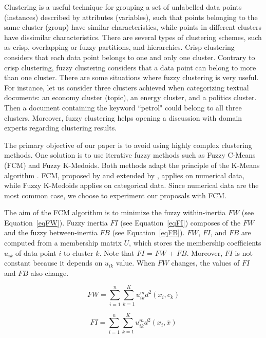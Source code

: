 \documentclass[runningheads,a4paper]{llncs}
\begin{document}
Clustering is a useful technique for grouping a set of unlabelled data points (instances) described by attributes (variables), such that points belonging to the same cluster (group) have similar characteristics, while points in different clusters have dissimilar characteristics. There are several types of clustering schemes, such as crisp, overlapping or fuzzy partitions, and hierarchies. Crisp clustering considers that each data point belongs to one and only one cluster. Contrary to crisp clustering, fuzzy clustering \cite{ruspini1970numerical} considers that a data point can belong to more than one cluster. There are some situations where fuzzy clustering is very useful. For instance, let us consider three clusters achieved when categorizing textual documents: an economy cluster (topic), an energy cluster, and a politics cluster. Then a document containing the keyword ``petrol" could belong to all three clusters. Moreover, fuzzy clustering helps opening a discussion with domain experts regarding clustering results. 

The primary objective of our paper is to avoid using highly complex clustering methods. One solution is to use iterative fuzzy methods such as Fuzzy C-Means (FCM) and Fuzzy K-Medoids. Both methods adapt the principle of the K-Means algorithm \cite{macqueen1967some}. FCM, proposed by \cite{dunn1973fuzzy} and extended by \cite{bezdek1984fcm}, applies on numerical data, while Fuzzy K-Medoids  \cite{kaufman1990partitioning} applies on categorical data. Since numerical data are the most common case, we choose to experiment our proposals with FCM.

The aim of the FCM algorithm is to minimize the fuzzy within-inertia $FW$ (see Equation~\ref{eqFW}). Fuzzy inertia $FI$ (see Equation~\ref{eqFI}) composes of the $FW$ and the fuzzy between-inertia $FB$ (see Equation~\ref{eqFB}). $FW$, $FI$, and $FB$ are computed from a membership matrix $U$, which stores the  membership coefficients $u_{ik}$ of data point $i$ to cluster $k$. Note that $FI$ = $FW$ + $FB$. Moreover, $FI$ is not constant because it depends on $u_{ik}$ value. When $FW$ changes, the values of $FI$ and $FB$ also change.

\begin{equation} \label{eqFW}
FW = \sum_{i=1}^n \sum_{k=1}^K  u_{ik}^m d^2 (x_i,c_k)
\end{equation}

\begin{equation} \label{eqFI}
FI = \sum_{i=1}^n \sum_{k=1}^K  u_{ik}^m d^2 (x_i,\overline{x})
\end{equation}
\end{document}
